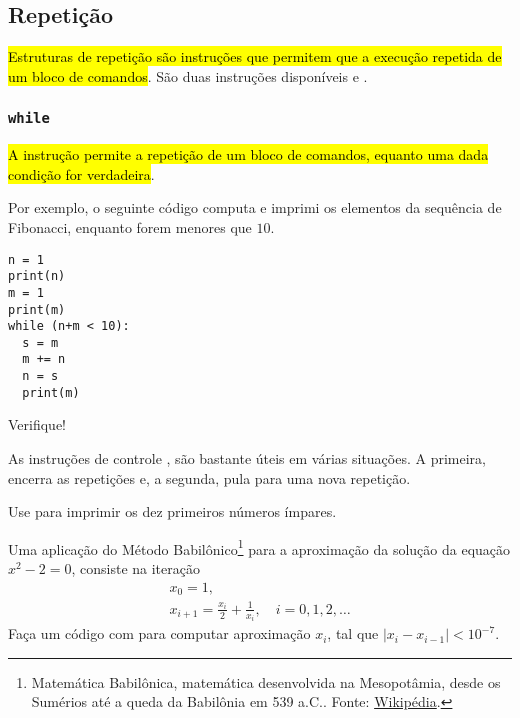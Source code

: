 \documentclass[a4paper,10pt,twoside]{article}
\begin{document}
\subsection{Repetição}

\hl{Estruturas de repetição são instruções que permitem que a execução repetida de um bloco de comandos}. São duas instruções disponíveis {\PYTHONwhile} e {\PYTHONfor}.

\subsubsection{\texttt{while}}

\hl{A instrução {\PYTHONwhile} permite a repetição de um bloco de comandos, equanto uma dada condição for verdadeira}. 

Por exemplo, o seguinte código computa e imprimi os elementos da sequência de Fibonacci{\fibonacci}, enquanto forem menores que $10$.

\begin{lstlisting}
n = 1
print(n)
m = 1
print(m)
while (n+m < 10):
  s = m
  m += n
  n = s
  print(m)
\end{lstlisting}

Verifique!

\begin{obs}
  As instruções de controle {\PYTHONbreak}, {\PYTHONcontinue} são bastante úteis em várias situações. A primeira, encerra as repetições e, a segunda, pula para uma nova repetição.
\end{obs}

\begin{exr}
  Use {\PYTHONwhile} para imprimir os dez primeiros números ímpares.
\end{exr}

\begin{exr}
  Uma aplicação do Método Babilônico\footnote{Matemática Babilônica, matemática desenvolvida na Mesopotâmia, desde os Sumérios até a queda da Babilônia em 539 a.C.. Fonte: \href{https://pt.wikipedia.org/wiki/Matem\%C3\%A1tica\_babil\%C3\%B4nica}{Wikipédia}.} para a aproximação da solução da equação $x^2-2 = 0$, consiste na iteração
  \begin{gather}
    x_0 = 1,\\
    x_{i+1} = \frac{x_i}{2} + \frac{1}{x_i},\quad i=0,1,2,\ldots
  \end{gather}
  Faça um código com {\PYTHONwhile} para computar aproximação $x_{i}$, tal que $|x_{i}-x_{i-1}|<10^{-7}$.
\end{exr}
\end{document}
